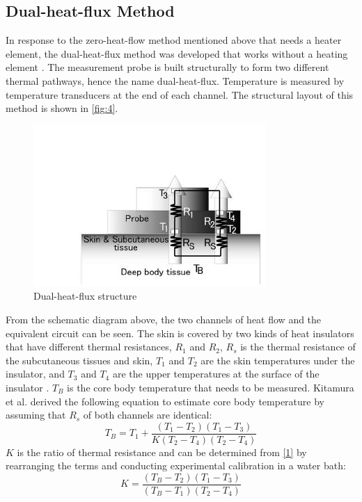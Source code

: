\subsection{Dual-heat-flux Method}
In response to the zero-heat-flow method mentioned above that needs a heater element, the dual-heat-flux method was developed that works without a heating element \cite{Kitamura2010}. The measurement probe is built structurally to form two different thermal pathways, hence the name dual-heat-flux. Temperature is measured by temperature transducers at the end of each channel. The structural layout of this method is shown in \autoref{fig:4}.
\begin{figure}[H]
	\centering
	\includegraphics[scale=0.9]{img/dual-heat-flux}
	\caption{Dual-heat-flux structure\cite{Kitamura2010}}
	\label{fig:4}
\end{figure} 
\noindent
From the schematic diagram above, the two channels of heat flow and the equivalent circuit can be seen. The skin is covered by two kinds of heat insulators that have different thermal resistances, $R_{1}$ and $R_{2}$, $R_{s}$ is the thermal resistance of the subcutaneous tissues and skin, $T_{1}$ and $T_{2}$ are the skin temperatures under the insulator, and $T_{3}$ and $T_{4}$ are the upper temperatures at the surface of the insulator \cite{Chen2019}. $T_{B}$ is the core body temperature that needs to be measured. Kitamura et al. \cite{Kitamura2010} derived the following equation to estimate core body temperature by assuming that $R_{s}$ of both channels are identical:
\begin{equation}
	T_{B} = T_{1} + \frac{(T_{1} - T_{2})(T_{1} - T_{3})}{K(T_{2} - T_{4})(T_{2} - T_{4})}
	\label{1}
\end{equation}
\noindent
$K$ is the ratio of thermal resistance and can be determined from \autoref{1} by rearranging the terms and conducting experimental calibration in a water bath:
\begin{equation}
	K = \frac{(T_{B} - T_{2})(T_{1} - T_{3})}{(T_{B} - T_{1})(T_{2} - T_{4})}
\end{equation}
